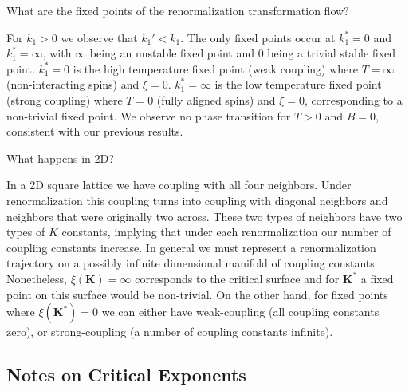 \documentclass[12pt, a4paper, oneside, openright, titlepage]{book}
\begin{document}
\begin{qst}
    What are the fixed points of the renormalization transformation flow?
\end{qst}

For $k_1 > 0$ we observe that $k_1' < k_1$. The only fixed points occur at $k_1^* = 0$ and $k_1^* = \infty$, with $\infty$ being an unstable fixed point and $0$ being a trivial stable fixed point. $k_1^* = 0$ is the high temperature fixed point (weak coupling) where $T = \infty$ (non-interacting spins) and $\xi = 0$. $k_1^* = \infty$ is the low temperature fixed point (strong coupling) where $T = 0$ (fully aligned spins) and $\xi = 0$, corresponding to a non-trivial fixed point. We observe no phase transition for $T > 0$ and $B = 0$, consistent with our previous results.

\begin{qst}
    What happens in 2D?
\end{qst}

In a 2D square lattice we have coupling with all four neighbors. Under renormalization this coupling turns into coupling with diagonal neighbors and neighbors that were originally two across. These two types of neighbors have two types of $K$ constants, implying that under each renormalization our number of coupling constants increase. In general we must represent a renormalization trajectory on a possibly infinite dimensional manifold of coupling constants. Nonetheless, $\xi(\mathbf{K}) = \infty$ corresponds to the critical surface and for $\mathbf{K}^*$ a fixed point on this surface would be non-trivial. On the other hand, for fixed points where $\xi(\mathbf{K}^*) = 0$ we can either have weak-coupling (all coupling constants zero), or strong-coupling (a number of coupling constants infinite).

\subsection{Notes on Critical Exponents}
\end{document}
